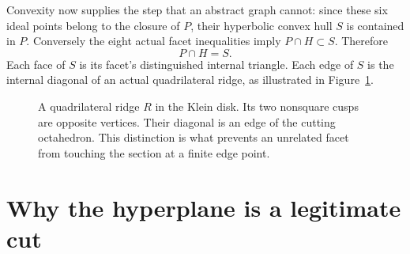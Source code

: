 \documentclass[11pt]{article}
\theoremstyle{remark}
\begin{document}
Convexity now supplies the step that an abstract graph cannot:
since these six ideal points belong to the closure of $P$, their
hyperbolic convex hull $S$ is contained in $P$. Conversely the
eight actual facet inequalities imply $P\cap H\subset S$.
Therefore
\[
 P\cap H=S.
\]
Each face of $S$ is its facet's distinguished internal triangle.
Each edge of $S$ is the internal diagonal of an actual
quadrilateral ridge, as illustrated in Figure~\ref{fig:diagonal}.

\begin{figure}[htbp]
\centering
{}
\caption{A quadrilateral ridge $R$ in the Klein disk. Its two
nonsquare cusps are opposite vertices. Their diagonal is an edge
of the cutting octahedron. This distinction is what prevents an
unrelated facet from touching the section at a finite edge point.}
\label{fig:diagonal}
\end{figure}

\section{Why the hyperplane is a legitimate cut}
\end{document}
